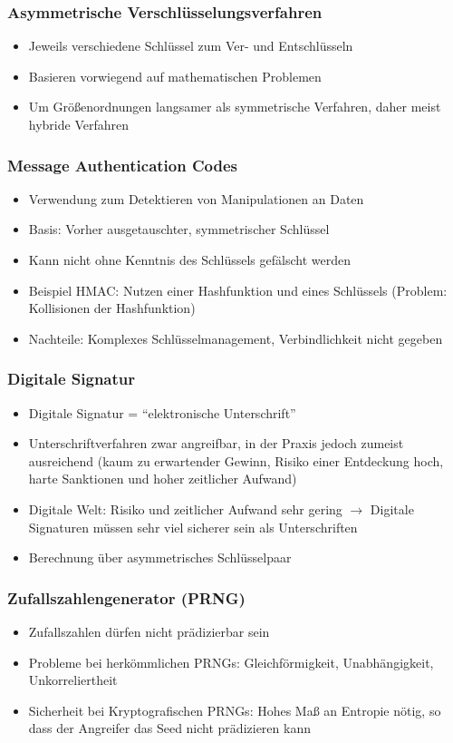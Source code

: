 \subsubsection{Asymmetrische Verschlüsselungsverfahren}
\begin{itemize}
	\item Jeweils verschiedene Schlüssel zum Ver- und Entschlüsseln
	\item Basieren vorwiegend auf mathematischen Problemen
	\item Um Größenordnungen langsamer als symmetrische Verfahren, daher meist hybride Verfahren
\end{itemize}

\subsubsection{Message Authentication Codes}
\begin{itemize}
	\item Verwendung zum Detektieren von Manipulationen an Daten
	\item Basis: Vorher ausgetauschter, symmetrischer Schlüssel
	\item Kann nicht ohne Kenntnis des Schlüssels gefälscht werden
	\item Beispiel HMAC: Nutzen einer Hashfunktion und eines Schlüssels (Problem: Kollisionen der Hashfunktion)
	\item Nachteile: Komplexes Schlüsselmanagement, Verbindlichkeit nicht gegeben
\end{itemize}

\subsubsection{Digitale Signatur}
\begin{itemize}
	\item Digitale Signatur = "`elektronische Unterschrift"'
	\item Unterschriftverfahren zwar angreifbar, in der Praxis jedoch zumeist ausreichend (kaum zu erwartender Gewinn, Risiko einer Entdeckung hoch, harte Sanktionen und hoher zeitlicher Aufwand)
	\item Digitale Welt: Risiko und zeitlicher Aufwand sehr gering $\rightarrow$ Digitale Signaturen müssen sehr viel sicherer sein als Unterschriften
	\item Berechnung über asymmetrisches Schlüsselpaar
\end{itemize}

\subsubsection{Zufallszahlengenerator (PRNG)}
\begin{itemize}
	\item Zufallszahlen dürfen nicht prädizierbar sein
	\item Probleme bei herkömmlichen PRNGs: Gleichförmigkeit, Unabhängigkeit, Unkorreliertheit
	\item Sicherheit bei Kryptografischen PRNGs: Hohes Maß an Entropie nötig, so dass der Angreifer das Seed nicht prädizieren kann
\end{itemize}

